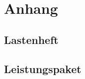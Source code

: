 \documentclass[a4paper,11pt]{article}%
\renewcommand{\\}{\vspace*{0.5\baselineskip} \newline}
\begin{document}
    \newpage


    \section{Anhang}

    \subsection{Lastenheft}
    

    \subsection{Leistungspaket}
    
\end{document}
